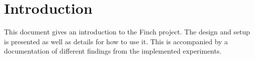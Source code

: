 \section{Introduction}

This document gives an introduction to the Finch project.
The design and setup is presented as well as details for how to use it.
This is accompanied by a documentation of different findings from the implemented experiments.


